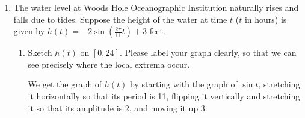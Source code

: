 \documentclass{article}
\begin{document}
\begin{enumerate}
\begin{enumerate}
    \begin{solution}
      We are asked to find $\displaystyle \int_{-3}^{2} f(x)\,dx =
      \int_{-3}^{2} \frac{x}{e^{x^2}}\,dx$.  Let's rewrite the integrand as
      $x e^{-x^2}$ and substitute .  Then, $du = -2x\,dx$,
      so . 
      \begin{align*}
        \int_{-3}^{2} \subd{x} e^{\sub{-x^2}}\,\subd{dx} &= \int_{-9}^{-4}
        e^\sub{u} \left( \subd{- \frac{du}{2}} \right)  \\
        &= - \frac{1}{2} e^u \Big|_{-9}^{-4} \\
        &= \boxed{- \frac{1}{2} e^{-4} + \frac{1}{2} e^{-9}}
      \end{align*}
      \begin{checkanswer}
        From our graph, we can see that this signed area should be negative
        (and our calculation is consistent with that).
      \end{checkanswer}
    \end{solution}

  \end{enumerate}

\item \label{sinusoid-woods-hole}

  The water level at Woods Hole Oceanographic Institution naturally rises
  and falls due to tides.  Suppose the height of the water at time $t$
  ($t$ in hours) is given by $\displaystyle h(t) = -2 \sin \left( \frac{2
      \pi}{11} t \right) + 3$ feet.
  \begin{enumerate}
  \item \label{sinusoid-woods-hole-graph}
    \begin{problem}[\vfill]
      Sketch $h(t)$ on $[0, 24]$.  Please label your graph clearly, so
      that we can see precisely where the local extrema occur. 
    \end{problem}

    \begin{solution}
      We get the graph of $h(t)$ by starting with the graph of $\sin t$,
      stretching it horizontally so that its period is 11, flipping it
      vertically and stretching it so that its amplitude is 2, and moving
      it up 3:
      \begin{center}
      \end{center}
    \end{solution}


\end{enumerate}
\end{enumerate}
\end{document}
